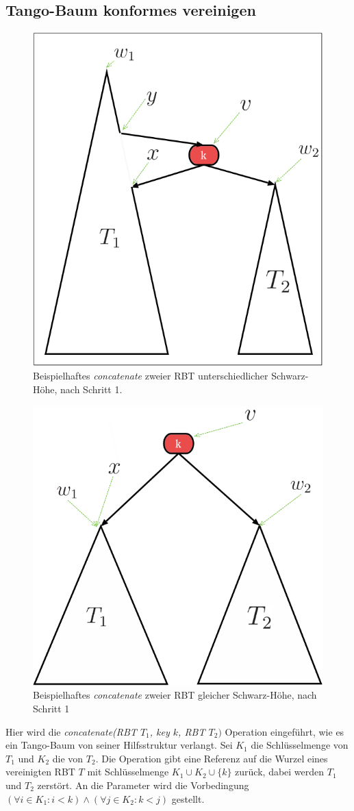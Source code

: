 \documentclass[a4paper,12pt]{article}
\begin{document}
\subsection{Tango-Baum konformes vereinigen} \label{vereinigen}
\begin{figure}[h]
	\centering
	\includegraphics[height= 0.6\textwidth]{"Medien/RotSchwarzBaum/vereinigen"}
	\caption{Beispielhaftes \textit{concatenate} zweier RBT unterschiedlicher Schwarz-Höhe, nach Schritt 1. }
	\label{fig:vereinigen}
\end{figure}
\begin{figure}[h]
	\centering
	\includegraphics[height= 0.6\textwidth]{"Medien/RotSchwarzBaum/vereinigen2"}
	\caption{Beispielhaftes \textit{concatenate} zweier RBT gleicher Schwarz-Höhe, nach Schritt 1 }
	\label{fig:vereinigen2}
\end{figure}
\noindent Hier wird die \textit{concatenate(RBT $T_1$, key $k$, RBT $T_2)$} Operation eingeführt, wie es ein Tango-Baum von seiner Hilfsstruktur verlangt. Sei $K_1$ die Schlüsselmenge von $T_1$ und $K_2$ die von $T_2$. Die Operation gibt eine Referenz auf die Wurzel eines vereinigten RBT $T$ mit Schlüsselmenge $K_1 \cup K_2 \cup \{k\} $ zurück, dabei werden $T_1$ und $T_2$ zerstört. An die Parameter wird die Vorbedingung $(\forall i \in K_1: i < k ) \land (\forall j \in K_2: k < j )$ gestellt.\\
\end{document}
